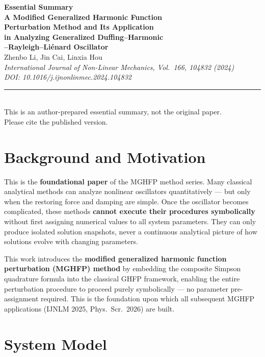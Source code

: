 \documentclass[11pt,a4paper]{article}
\begin{document}
\raggedbottom

\begin{center}
{\LARGE\bfseries\color{primary}Essential Summary}\\[12pt]
{\large\bfseries A Modified Generalized Harmonic Function\\Perturbation Method and Its Application\\in Analyzing Generalized Duffing--Harmonic\\--Rayleigh--Li\'enard Oscillator}\\[8pt]
{\normalsize Zhenbo Li, Jin Cai, Linxia Hou}\\[4pt]
{\small\itshape International Journal of Non-Linear Mechanics, Vol.\ 166, 104832 (2024)\\DOI: 10.1016/j.ijnonlinmec.2024.104832}\\[6pt]
{\small\rule{0.7\textwidth}{0.5pt}}\\[4pt]
{\small\color{accent}This is an author-prepared essential summary, not the original paper.\\Please cite the published version.}
\end{center}

\vspace{0.5em}

\section{Background and Motivation}

This is the \textbf{foundational paper} of the MGHFP method series. Many classical analytical methods can analyze nonlinear oscillators quantitatively --- but only when the restoring force and damping are simple. Once the oscillator becomes complicated, these methods \textbf{cannot execute their procedures symbolically} without first assigning numerical values to all system parameters. They can only produce isolated solution snapshots, never a continuous analytical picture of how solutions evolve with changing parameters.

This work introduces the \textbf{modified generalized harmonic function perturbation (MGHFP) method} by embedding the composite Simpson quadrature formula into the classical GHFP framework, enabling the entire perturbation procedure to proceed purely symbolically --- no parameter pre-assignment required. This is the foundation upon which all subsequent MGHFP applications (IJNLM 2025, Phys.\ Scr.\ 2026) are built.

\section{System Model}
\end{document}
